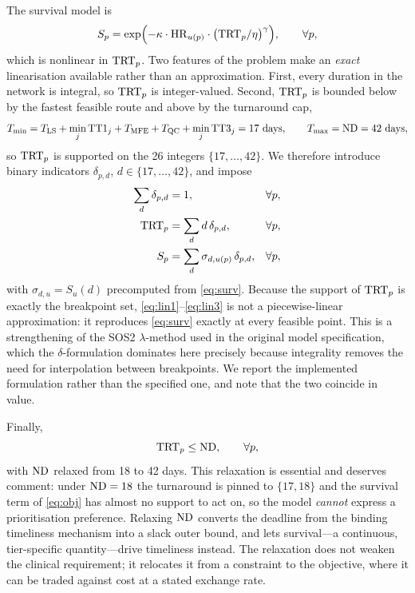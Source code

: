 The survival model is
\begin{equation}
  S_p = \exp\Bigl(-\kappa \cdot \mathrm{HR}_{u(p)} \cdot \bigl(\mathrm{TRT}_p / \eta\bigr)^{\gamma}\Bigr),
  \qquad \forall p, \label{eq:surv}
\end{equation}
which is nonlinear in $\mathrm{TRT}_p$. Two features of the problem make an
\emph{exact} linearisation available rather than an approximation. First,
every duration in the network is integral, so $\mathrm{TRT}_p$ is integer-valued.
Second, $\mathrm{TRT}_p$ is bounded below by the fastest feasible route and above by
the turnaround cap,
\[
  T_{\min} = T_{\mathrm{LS}} + \min_j \mathrm{TT1}_j + T_{\mathrm{MFE}} + T_{\mathrm{QC}} + \min_j \mathrm{TT3}_j = 17\ \text{days},
  \qquad T_{\max} = \mathrm{ND} = 42\ \text{days},
\]
so $\mathrm{TRT}_p$ is supported on the 26 integers $\{17, \dots, 42\}$. We therefore
introduce binary indicators $\delta_{p,d}$, $d \in \{17,\dots,42\}$, and impose
\begin{align}
  \sum_{d} \delta_{p,d} &= 1, & &\forall p, \label{eq:lin1}\\
  \mathrm{TRT}_p &= \sum_{d} d\,\delta_{p,d}, & &\forall p, \label{eq:lin2}\\
  S_p &= \sum_{d} \sigma_{d,u(p)}\,\delta_{p,d}, & &\forall p, \label{eq:lin3}
\end{align}
with $\sigma_{d,u} = S_u(d)$ precomputed from \eqref{eq:surv}. Because the
support of $\mathrm{TRT}_p$ is exactly the breakpoint set,
\eqref{eq:lin1}--\eqref{eq:lin3} is not a piecewise-linear approximation: it
reproduces \eqref{eq:surv} exactly at every feasible point. This is a
strengthening of the SOS2 $\lambda$-method used in the original model
specification, which the $\delta$-formulation dominates here precisely because
integrality removes the need for interpolation between breakpoints. We report
the implemented formulation rather than the specified one, and note that the
two coincide in value.

Finally,
\begin{equation}
  \mathrm{TRT}_p \le \mathrm{ND}, \qquad \forall p, \label{eq:nd}
\end{equation}
with $\mathrm{ND}$ relaxed from 18 to 42 days. This relaxation is essential and
deserves comment: under $\mathrm{ND} = 18$ the turnaround is pinned to $\{17, 18\}$ and
the survival term of \eqref{eq:obj} has almost no support to act on, so the
model \emph{cannot} express a prioritisation preference. Relaxing $\mathrm{ND}$
converts the deadline from the binding timeliness mechanism into a slack outer
bound, and lets survival---a continuous, tier-specific quantity---drive
timeliness instead. The relaxation does not weaken the clinical requirement; it
relocates it from a constraint to the objective, where it can be traded against
cost at a stated exchange rate.

